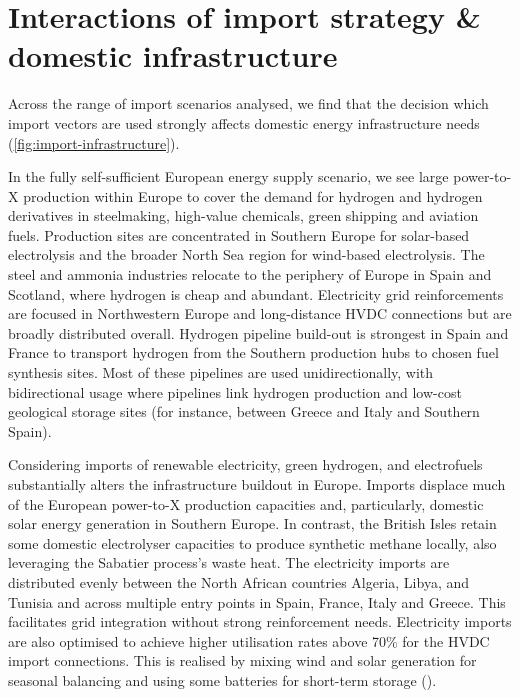 \section*{Interactions of import strategy \& domestic infrastructure}

Across the range of import scenarios analysed, we find that the decision which
import vectors are used strongly affects domestic energy infrastructure needs
(\cref{fig:import-infrastructure}).


In the fully self-sufficient European energy supply scenario, we see large
\mbox{power-to-X} production within Europe to cover the demand for hydrogen and
hydrogen derivatives in steelmaking, high-value chemicals, green shipping and
aviation fuels. Production sites are concentrated in Southern Europe for
solar-based electrolysis and the broader North Sea region for wind-based
electrolysis. The steel and ammonia industries relocate to the periphery of
Europe in Spain and Scotland, where hydrogen is cheap and abundant. Electricity
grid reinforcements are focused in Northwestern Europe and long-distance HVDC
connections but are broadly distributed overall. Hydrogen pipeline build-out is
strongest in Spain and France to transport hydrogen from the Southern production
hubs to chosen fuel synthesis sites. Most of these pipelines are used
unidirectionally, with bidirectional usage where pipelines link hydrogen
production and low-cost geological storage sites (for instance, between Greece
and Italy and Southern Spain).


Considering imports of renewable electricity, green hydrogen, and electrofuels
substantially alters the infrastructure buildout in Europe. Imports displace
much of the European power-to-X production capacities and, particularly,
domestic solar energy generation in Southern Europe. In contrast, the British
Isles retain some domestic electrolyser capacities to produce synthetic methane
locally, also leveraging the Sabatier process's waste heat. The electricity
imports are distributed evenly between the North African countries Algeria,
Libya, and Tunisia and across multiple entry points in Spain, France, Italy and
Greece. This facilitates grid integration without strong reinforcement needs.
Electricity imports are also optimised to achieve higher utilisation rates above
70\% for the HVDC import connections. This is realised by mixing wind and solar
generation for seasonal balancing and using some batteries for short-term
storage ().


